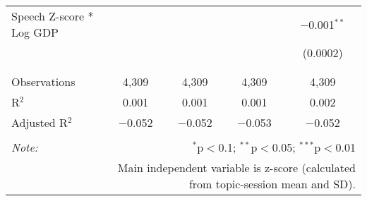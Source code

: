 \begin{table}[!htbp]
\begin{tabular}{@{\extracolsep{5pt}}lcccc}
 Speech Z-score * Log GDP &  &  &  & $-$0.001$^{**}$ \\ 
  &  &  &  & (0.0002) \\ 
  & & & & \\ 
\hline \\[-1.8ex] 
Observations & 4,309 & 4,309 & 4,309 & 4,309 \\ 
R$^{2}$ & 0.001 & 0.001 & 0.001 & 0.002 \\ 
Adjusted R$^{2}$ & $-$0.052 & $-$0.052 & $-$0.053 & $-$0.052 \\ 
\hline 
\hline \\[-1.8ex] 
\textit{Note:}  & \multicolumn{4}{r}{$^{*}$p$<$0.1; $^{**}$p$<$0.05; $^{***}$p$<$0.01} \\ 
 & \multicolumn{4}{r}{Main independent variable is z-score (calculated from topic-session mean and SD).} \\ 
\end{tabular} 
\end{table} 
